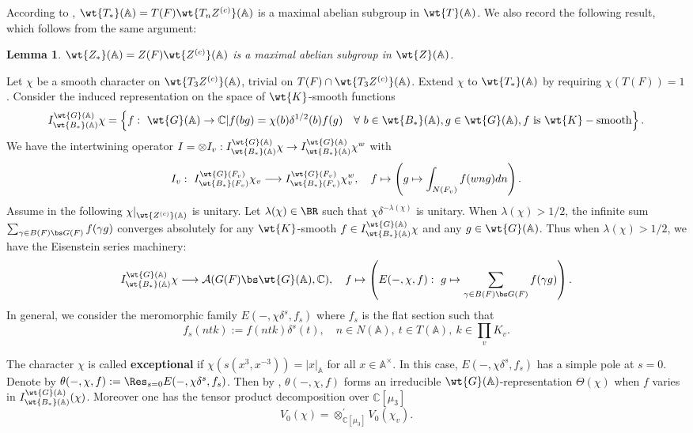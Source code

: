 \documentclass[11pt,reqno]{amsart}
\newcommand{\BA}{{\mathbb {A}}} \newcommand{\BB}{{\mathbb {B}}}
\newcommand{\BC}{{\mathbb {C}}} \newcommand{\BD}{{\mathbb {D}}}
\newcommand{\CA}{{\mathcal {A}}} \newcommand{\CB}{{\mathcal {B}}}
\newcommand{\lra}{\longrightarrow}\newcommand{\lla}{\longleftarrow}
\theoremstyle{plain}
\newtheorem{lem}[thm]{Lemma}  \newtheorem{prop}[thm]{Proposition}
\theoremstyle{remark} \newtheorem{remark}[thm]{Remark}
\theoremstyle{definition} \newtheorem{exercise}[thm]{Exercise}
\theoremstyle{definition} \newtheorem{example}[thm]{Example} \newtheorem{condition}[thm]{Condition}
\numberwithin{equation}{section}
\renewcommand{\-}{\text{--}}
\begin{document}
According to \cite[Lemma II.1.1]{KP84}, $\wt{T_*}(\BA)=T(F)\wt{T_nZ^{(c)}}(\BA)$ is a maximal abelian subgroup in $\wt{T}(\BA)$. We also record the following result, which follows from the same  argument:
\begin{lem}\label{center}$\wt{Z_*}(\BA)=Z(F)\wt{Z^{(c)}}(\BA)$ is a maximal abelian subgroup in $\wt{Z}(\BA)$.
\end{lem}
Let $\chi$ be a smooth character on $\wt{T_3Z^{(c)}}(\BA)$, trivial on $T(F)\cap\wt{T_3Z^{(c)}}(\BA)$. Extend $\chi$ to $\wt{T_*}(\BA)$ by requiring $\chi(T(F))=1$. Consider the induced representation on the space of $\wt{K}$-smooth functions
\[I_{\wt{B_*}(\BA)}^{\wt{G}(\BA)}\chi=\left\{f:\ \wt{G}(\BA)\to\BC| f(bg)=\chi(b)\delta^{1/2}(b)f(g)\quad  \forall\ b\in\wt{B_*}(\BA), g\in\wt{G}(\BA), f\ \text{is}\ \wt{K}-\text{smooth}\right\}.\]
We have the intertwining operator $I=\otimes I_v: I_{\wt{B_*}(\BA)}^{\wt{G}(\BA)}\chi\to I_{\wt{B_*}(\BA)}^{\wt{G}(\BA)}\chi^w$ with  
\[I_v:\ I_{\wt{B_*}(F_v)}^{\wt{G}(F_v)}\chi_v\lra I_{\wt{B_*}(F_v)}^{\wt{G}(F_v)}\chi_v^w, \quad f\mapsto \left( g\mapsto\int_{N(F_v)}f(wng)dn\right).\]
Assume in the following $\chi|_{\wt{Z^{(c)}}(\BA)}$ is unitary. Let $\lambda(\chi)\in \BR$ such that $\chi\delta^{-\lambda(\chi)}$ is unitary. When  $\lambda(\chi)>1/2$, the infinite sum $\sum_{\gamma\in B(F)\bs G(F)}f(\gamma g)$ converges  absolutely for any $\wt{K}$-smooth $f\in I_{\wt{B_*}(\BA)}^{\wt{G}(\BA)}\chi$ and any $g\in\wt{G}(\BA)$. Thus when $\lambda(\chi)>1/2$, we have the  Eisenstein series machinery:
\[I_{\wt{B_*}(\BA)}^{\wt{G}(\BA)}\chi\lra\CA(G(F)\bs \wt{G}(\BA),\BC),\quad  f\mapsto \left(E(-,\chi,f):\ g\mapsto \sum_{\gamma\in B(F)\bs G(F)}f(\gamma g)\right).\]
In general, we consider the meromorphic family $E(-,\chi\delta^s, f_s)$ where $f_s$ is the flat section such that \[f_s(ntk):=f(ntk)\delta^s(t),\quad n\in N(\BA),\ t\in T(\BA),\ k\in\prod_v K_v.\]



The character $\chi$ is called \textbf{exceptional} if $\chi\left(s(x^3,x^{-3})\right)=|x|_{\BA}$ for all $x\in \BA^\times$. In this case, $E(-,\chi\delta^s, f_s)$ has a simple pole at $s=0$. Denote  by $\theta(-,\chi,f):=\Res_{s=0} E(-,\chi\delta^s,f_s)$.  Then by \cite[Theorem II.2.1]{KP84},  $\theta(-,\chi,f)$ forms an irreducible $\wt{G}(\BA)$-representation $\Theta(\chi)$ when $f$ varies in $I_{\wt{B_*}(\BA)}^{\wt{G}(\BA)}(\chi)$. Moreover one has the tensor product decomposition over $\BC[\mu_3]$
\[V_0(\chi)=\otimes_{\BC[\mu_3]}^\prime V_0(\chi_v).\]
  
\end{document}
